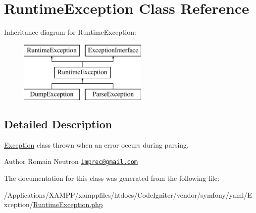 \hypertarget{class_symfony_1_1_component_1_1_yaml_1_1_exception_1_1_runtime_exception}{}\section{Runtime\+Exception Class Reference}
\label{class_symfony_1_1_component_1_1_yaml_1_1_exception_1_1_runtime_exception}
Inheritance diagram for Runtime\+Exception\+:\begin{figure}[H]
\begin{center}
\leavevmode
\includegraphics[height=3.000000cm]{class_symfony_1_1_component_1_1_yaml_1_1_exception_1_1_runtime_exception}
\end{center}
\end{figure}


\subsection{Detailed Description}
\mbox{\hyperlink{namespace_symfony_1_1_component_1_1_yaml_1_1_exception}{Exception}} class thrown when an error occurs during parsing.

\begin{DoxyAuthor}{Author}
Romain Neutron \href{mailto:imprec@gmail.com}{\tt imprec@gmail.\+com} 
\end{DoxyAuthor}


The documentation for this class was generated from the following file\+:\begin{DoxyCompactItemize}
\item 
/\+Applications/\+X\+A\+M\+P\+P/xamppfiles/htdocs/\+Code\+Igniter/vendor/symfony/yaml/\+Exception/\mbox{\hyperlink{symfony_2yaml_2_exception_2_runtime_exception_8php}{Runtime\+Exception.\+php}}\end{DoxyCompactItemize}
